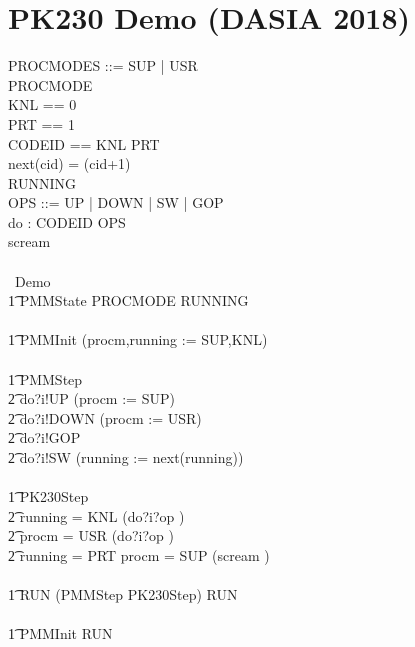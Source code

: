 \chapter{PK230 Demo (DASIA 2018)}

\newpage
\begin{circus}
PROCMODES ::= SUP | USR \\
PROCMODE  \\
   KNL    == 0
\\ PRT    == 1
\\ CODEID == KNL \upto PRT
\\ next(cid) = (cid+1) 
\\
RUNNING  \\
   OPS ::= UP | DOWN | SW | GOP
\\ \circchannel do : CODEID \cross OPS
\\ \circchannel scream \\
\\
\circprocess\ Demo \circdef \circbegin \\
\t1 \circstate PMMState  PROCMODE \land RUNNING \\
\\
\t1 PMMInit \circdef (procm,running := SUP,KNL) \\
\\
\t1 PMMStep \circdef \\
\t2             do?i!UP \then (procm := SUP) \circseq \Skip \\
\t2 \extchoice  do?i!DOWN \then (procm := USR) \circseq \Skip \\
\t2 \extchoice  do?i!GOP \then \Skip \\
\t2 \extchoice  do?i!SW \then (running := next(running)) \circseq \Skip \\
\\
\t1 PK230Step \circdef \\
\t2 \lcircguard running = KNL \rcircguard \circguard (do?i?op \then \Skip)\\
\t2 \extchoice \lcircguard procm = USR \rcircguard \circguard (do?i?op \then \Skip)\\
\t2 \extchoice \lcircguard running = PRT \land procm = SUP \rcircguard \circguard (scream \then \Stop)\\
\\
\t1 RUN \circdef (PMMStep \interleave PK230Step) \circseq RUN \\
\\
\t1 \circspot PMMInit \circseq RUN \\
\circend
\end{circus}
